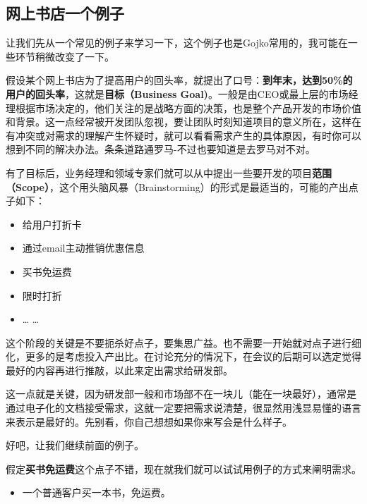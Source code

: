 \subsection{网上书店一个例子}
\label{网上书店一个例子}

让我们先从一个常见的例子来学习一下，这个例子也是Gojko常用的，我可能在一些环节稍微改变了一下。

假设某个网上书店为了提高用户的回头率，就提出了口号：\textbf{到年末，达到50\%的用户的回头率}，这就是\textbf{目标（Business Goal)}。一般是由CEO或最上层的市场经理根据市场决定的，他们关注的是战略方面的决策，也是整个产品开发的市场价值和背景。这一点经常被开发团队忽视，要让团队时刻知道项目的意义所在，这样在有冲突或对需求的理解产生怀疑时，就可以看看需求产生的具体原因，有时你可以想到不同的解决办法。条条道路通罗马-不过也要知道是去罗马对不对。

有了目标后，业务经理和领域专家们就可以从中提出一些要开发的项目\textbf{范围（Scope）}，这个用头脑风暴（Brainstorming）的形式是最适当的，可能的产出点子如下：

\begin{itemize}
\item 给用户打折卡

\item 通过email主动推销优惠信息

\item 买书免运费

\item 限时打折

\item {\ldots} {\ldots}

\end{itemize}

这个阶段的关键是不要扼杀好点子，要集思广益。也不需要一开始就对点子进行细化，更多的是考虑投入产出比。在讨论充分的情况下，在会议的后期可以选定觉得最好的内容再进行推敲，以此来定出需求给研发部。

这一点就是关键，因为研发部一般和市场部不在一块儿（能在一块最好），通常是通过电子化的文档接受需求，这就一定要把需求说清楚，很显然用浅显易懂的语言来表示是最好的。先别看，你自己想想如果你来写会是什么样子。

好吧，让我们继续前面的例子。

假定\textbf{买书免运费}这个点子不错，现在就我们就可以试试用例子的方式来阐明需求。

\begin{itemize}
\item 一个普通客户买一本书，免运费。

\end{itemize}

